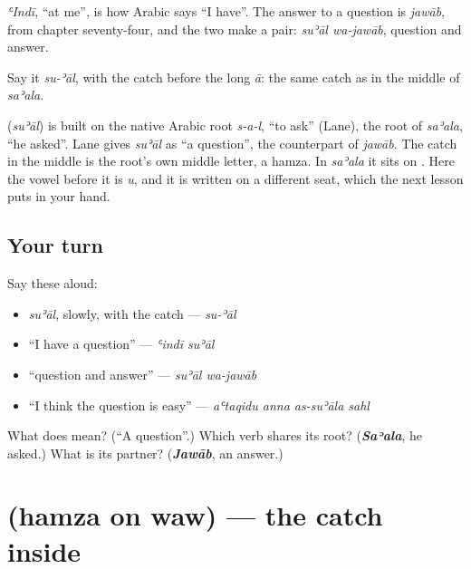 \emph{ʿIndī}, \textquotedblleft{}at me\textquotedblright{}, is how Arabic says \textquotedblleft{}I have\textquotedblright{}. The answer to a question is \emph{jawāb}, from chapter seventy-four, and the two make a pair: \emph{suʾāl wa-jawāb}, question and answer.

Say it \emph{su-ʾāl}, with the catch before the long \emph{ā}: the same catch as in the middle of \emph{saʾala}.

\begin{cousinweb}
\textbf{} (\emph{suʾāl}) is built on the native Arabic root \emph{s-a-l}, \textquotedblleft{}to ask\textquotedblright{} (Lane), the root of \emph{saʾala}, \textquotedblleft{}he asked\textquotedblright{}. Lane gives \emph{suʾāl} as \textquotedblleft{}a question\textquotedblright{}, the counterpart of \emph{jawāb}. The catch in the middle is the root's own middle letter, a hamza. In \emph{saʾala} it sits on \textbf{}. Here the vowel before it is \emph{u}, and it is written on a different seat, which the next lesson puts in your hand.
\end{cousinweb}

\subsection*{Your turn}
Say these aloud:

\begin{itemize}
\raggedright
  \item \emph{suʾāl}, slowly, with the catch — \emph{su-ʾāl}
  \item \textquotedblleft{}I have a question\textquotedblright{} — \emph{ʿindī suʾāl}
  \item \textquotedblleft{}question and answer\textquotedblright{} — \emph{suʾāl wa-jawāb}
  \item \textquotedblleft{}I think the question is easy\textquotedblright{} — \emph{aʿtaqidu anna as-suʾāla sahl}
\end{itemize}

\begin{tcolorbox}[breakable,colback=teal!4,colframe=teal!35!black,title={Before you move on}]
What does  mean? (\textquotedblleft{}A question\textquotedblright{}.) Which verb shares its root? (\emph{\textbf{Saʾala}}, he asked.) What is its partner? (\emph{\textbf{Jawāb}}, an answer.)
\end{tcolorbox}
\section[\texorpdfstring{\ar{ؤ} (hamza on waw)}{ؤ (hamza on waw)}]{ (hamza on waw) — the catch inside }

